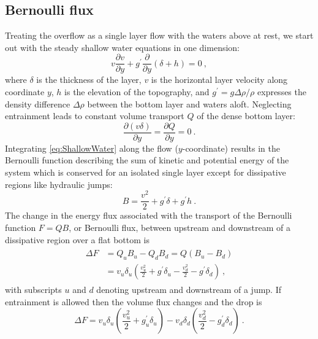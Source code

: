 \documentclass{ametsocV6.1}
\begin{document}
\subsection{Bernoulli flux}\label{sec:Bernoulli}
Treating the overflow as a single layer flow with the waters above at rest, we start out with the steady shallow water equations in one dimension:
\begin{equation}
    v \frac{\partial v}{\partial y} + g^\prime \frac{\partial}{\partial y} (\delta + h) = 0\ ,
    \label{eq:ShallowWater}
\end{equation}
where $\delta$ is the thickness of the layer, $v$ is the horizontal layer velocity along coordinate $y$, $h$ is the elevation of the topography, and $g^\prime=g \Delta \rho / \rho$ expresses the density difference $\Delta \rho$ between the bottom layer and waters aloft.
Neglecting entrainment leads to constant volume transport $Q$ of the dense bottom layer:
\begin{equation}
\frac{\partial (v \delta)}{\partial y} = \frac{\partial Q}{\partial y} = 0\ .
\end{equation}
Integrating \eqref{eq:ShallowWater} along the flow ($y$-coordinate) results in the Bernoulli function describing the sum of kinetic and potential energy of the system which is conserved for an isolated single layer except for dissipative regions like hydraulic jumps:
\begin{equation}
    B = \frac{v^2}{2} + g^\prime \delta + g^\prime h\ .
\end{equation}
The change in the energy flux associated with the transport of the Bernoulli function $F=Q B$, or Bernoulli flux, between upstream and downstream of a dissipative region over a flat bottom is
\begin{align}
\begin{split}
\Delta F &= Q_u B_u -Q_d B_d = Q(B_u - B_d) \\
    &= v_u \delta_u (\frac{v_u^2}{2} + g^\prime \delta_u - \frac{v_d^2}{2} -g^\prime \delta_d)\ ,
\end{split}
\label{eq:BernoulliNoEntrainment}
\end{align}
with subscripts $u$ and $d$ denoting upstream and downstream of a jump.
If entrainment is allowed then the volume flux changes and the drop is
\begin{equation}
\Delta F = v_u \delta_u (\frac{v_u^2}{2} + g^\prime_u \delta_u) - v_d \delta_d(\frac{v_d^2}{2} -g^\prime_d \delta_d)\ .
\label{eq:BernoulliEntrainment}
\end{equation}
\end{document}
